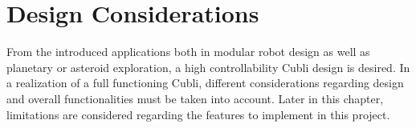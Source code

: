 \chapter{Design Considerations}\label{chap:designConsiderations}

From the introduced applications both in modular robot design as well as planetary or asteroid exploration, a high controllability Cubli design is desired.
In a realization of a full functioning Cubli, different considerations regarding design and overall functionalities must be taken into account. Later in this chapter, limitations are considered regarding the features to implement in this project.






